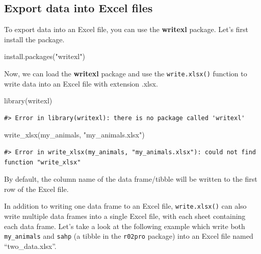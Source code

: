 \documentclass[
]{book}
\newenvironment{Shaded}{\begin{snugshade}}{\end{snugshade}}
\newcommand{\FunctionTok}[1]{\textcolor[rgb]{0.00,0.00,0.00}{#1}}
\newcommand{\NormalTok}[1]{#1}
\newcommand{\StringTok}[1]{\textcolor[rgb]{0.31,0.60,0.02}{#1}}
\begin{document}
\hypertarget{export-data-into-excel-files}{%
\subsection{Export data into Excel files}\label{export-data-into-excel-files}}

To export data into an Excel file, you can use the \textbf{writexl} package. Let's first install the package.

\begin{Shaded}
\begin{Highlighting}[]
\FunctionTok{install.packages}\NormalTok{(}\StringTok{"writexl"}\NormalTok{)}
\end{Highlighting}
\end{Shaded}

Now, we can load the \textbf{writexl} package and use the \texttt{write.xlsx()} function to write data into an Excel file with extension .xlsx.

\begin{Shaded}
\begin{Highlighting}[]
\FunctionTok{library}\NormalTok{(writexl)}
\end{Highlighting}
\end{Shaded}

\begin{verbatim}
#> Error in library(writexl): there is no package called 'writexl'
\end{verbatim}

\begin{Shaded}
\begin{Highlighting}[]
\FunctionTok{write\_xlsx}\NormalTok{(my\_animals, }\StringTok{"my\_animals.xlsx"}\NormalTok{)}
\end{Highlighting}
\end{Shaded}

\begin{verbatim}
#> Error in write_xlsx(my_animals, "my_animals.xlsx"): could not find function "write_xlsx"
\end{verbatim}

By default, the column name of the data frame/tibble will be written to the first row of the Excel file.

In addition to writing one data frame to an Excel file, \texttt{write.xlsx()} can also write multiple data frames into a single Excel file, with each sheet containing each data frame. Let's take a look at the following example which write both \texttt{my\_animals} and \texttt{sahp} (a tibble in the \texttt{r02pro} package) into an Excel file named ``two\_data.xlsx''.
\end{document}
